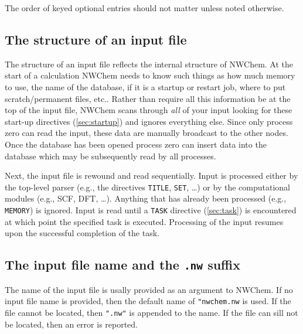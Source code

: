 The order of keyed optional entries should not matter unless noted
otherwise.

\subsection{The structure of an input file}
\label{sec:inputstructure}

The structure of an input file reflects the internal structure of
NWChem.  At the start of a calculation NWChem needs to know such
things as how much memory to use, the name of the database, if it is a
startup or restart job, where to put scratch/permanent files, etc..
Rather than require all this information be at the top of the input
file, NWChem scans through {\em all} of your input looking for these
start-up directives (\ref{sec:startup}) and ignores everything else.
Since only process zero can read the input, these data are manually
broadcast to the other nodes.  Once the database has been opened
process zero can insert data into the database which may be
subsequently read by all processes.

Next, the input file is rewound and read sequentially.  Input is
processed either by the top-level parser (e.g., the directives
\verb+TITLE+, \verb+SET+, \ldots) or by the computational modules
(e.g., SCF, DFT, \ldots).  Anything that has already been processed
(e.g., \verb+MEMORY+) is ignored.  Input is read until a \verb+TASK+
directive (\ref{sec:task}) is encountered at which point the specified
task is executed.  Processing of the input resumes upon the successful
completion of the task.

\subsection{The input file name and the {\tt .nw} suffix}

The name of the input file is usally provided as an argument to
NWChem.  If no input file name is provided, then the default name of
\verb+"nwchem.nw+ is used.  If the file cannot be located, then
\verb+".nw"+ is appended to the name.  If the file can sill not be
located, then an error is reported.
